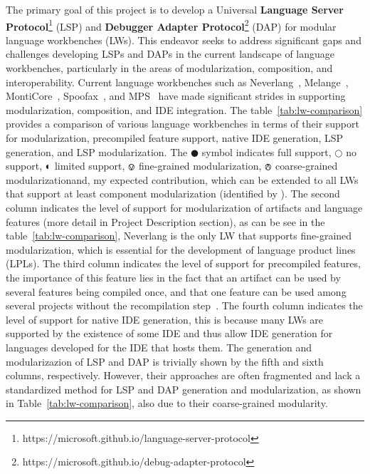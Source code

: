 The primary goal of this project is to develop a Universal \textbf{Language Server Protocol}\footnote{https://microsoft.github.io/language-server-protocol} (LSP) and \textbf{Debugger Adapter Protocol}\footnote{https://microsoft.github.io/debug-adapter-protocol} (DAP) for modular language workbenches (LWs). This endeavor seeks to address significant gaps and challenges developing LSPs and DAPs in the current landscape of language workbenches, particularly in the areas of modularization, composition, and interoperability. Current language workbenches such as Neverlang~\cite{Cazzola20}, Melange~\cite{Degueule15}, MontiCore~\cite{Krahn10}, Spoofax~\cite{Visser10}, and MPS~\cite{Volter11, Voelter12} have made significant strides in supporting modularization, composition, and IDE integration.
The table~\ref{tab:lw-comparison} provides a comparison of various language workbenches in terms of their support for modularization, precompiled feature support, native IDE generation, LSP generation, and LSP modularization. The $\CIRCLE$ symbol indicates full support, $\Circle$ no support, $\LEFTcircle$ limited support, $\circledvee$ fine-grained modularization, $\circledwedge$ coarse-grained modularizationand, \FiveStarConvex my expected contribution, which can be extended to all LWs that support at least component modularization (identified by ).
The second column indicates the level of support for modularization of artifacts and language features (more detail in Project Description section), as can be see in the table~\ref{tab:lw-comparison}, Neverlang is the only LW that supports fine-grained modularization, which is essential for the development of language product lines~\cite{Cazzola21b, Cazzola15f} (LPLs). The third column indicates the level of support for precompiled features, the importance of this feature lies in the fact that an artifact can be used by several features being compiled once, and that one feature can be used among several projects without the recompilation step~\cite{Leduc20}. The fourth column indicates the level of support for native IDE generation, this is because many LWs are supported by the existence of some IDE and thus allow IDE generation for languages developed for the IDE that hosts them.
The generation and modularizazion of LSP and DAP is trivially shown by the fifth and sixth columns, respectively.
However, their approaches are often fragmented and lack a standardized method for LSP and DAP generation and modularization, as shown in Table~\ref{tab:lw-comparison}, also due to their coarse-grained modularity.
